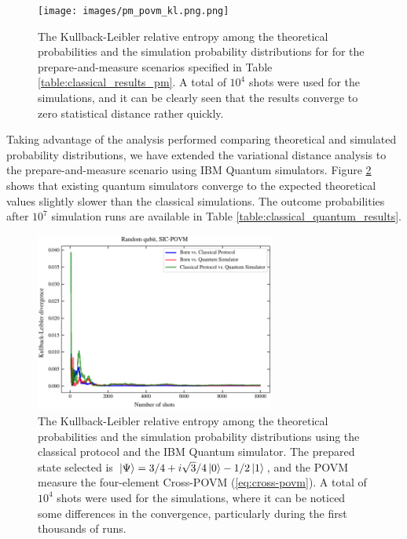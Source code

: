 \begin{figure}[h!]
\centering
\texttt{[image: images/pm\_povm\_kl.png.png]}
\caption{The Kullback-Leibler relative entropy among the theoretical probabilities and the simulation probability distributions for for the prepare-and-measure scenarios specified in Table \ref{table:classical_results_pm}. A total of $10^4$ shots were used for the simulations, and it can be clearly seen that the results converge to zero statistical distance rather quickly.}
\label{fig:classical_results_kl}
\end{figure}

Taking advantage of the analysis performed comparing theoretical and simulated probability distributions, we have extended the variational distance analysis to the prepare-and-measure scenario using IBM Quantum simulators. Figure \ref{fig:classical_quantum_results_kl} shows that existing quantum simulators converge to the expected theoretical values slightly slower than the classical simulations. The outcome probabilities after $10^7$ simulation runs are available in Table \ref{table:classical_quantum_results}.

\begin{figure}[h!]
\centering
\includegraphics[width=0.7\textwidth]{images/pm_povm_kl_bcq.png}
\caption{The Kullback-Leibler relative entropy among the theoretical probabilities and the simulation probability distributions using the classical protocol and the IBM Quantum simulator. The prepared state selected is $\ket{\Psi}=3/4 + i \sqrt{3}/4 \ket{0} - 1/2 \ket{1}$, and the POVM measure the four-element Cross-POVM (\ref{eq:cross-povm}). A total of $10^4$ shots were used for the simulations, where it can be noticed some differences in the convergence, particularly during the first thousands of runs.}
\label{fig:classical_quantum_results_kl}
\end{figure}


